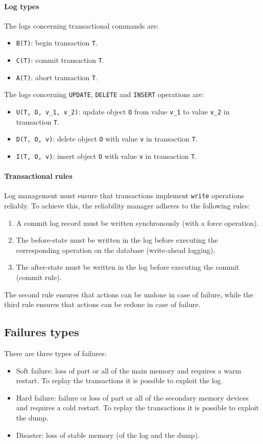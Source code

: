 \paragraph*{Log types}
The logs concerning transactional commands are: 
\begin{itemize}
    \item \texttt{B(T)}: begin transaction \texttt{T}.
    \item \texttt{C(T)}: commit transaction \texttt{T}.
    \item \texttt{A(T)}: abort transaction \texttt{T}.
\end{itemize}
The logs concerning \texttt{UPDATE}, \texttt{DELETE} and \texttt{INSERT} operations are:
\begin{itemize}
    \item \texttt{U(T, O, v\_1, v\_2)}: update object \texttt{O} from value \texttt{v\_1} to value \texttt{v\_2} in transaction \texttt{T}.
    \item \texttt{D(T, O, v)}: delete object \texttt{O} with value \texttt{v} in transaction \texttt{T}.
    \item \texttt{I(T, O, v)}: insert object \texttt{O} with value \texttt{v} in transaction \texttt{T}.
\end{itemize}

\paragraph{Transactional rules}
Log management must ensure that transactions implement \texttt{write} operations reliably. 
To achieve this, the reliability manager adheres to the following rules:
\begin{enumerate}
  \item A commit log record must be written synchronously (with a force operation).
  \item The before-state must be written in the log before executing the corresponding operation on the database (write-ahead logging).
  \item The after-state must be written in the log before executing the commit (commit rule).
\end{enumerate}
The second rule ensures that actions can be undone in case of failure, while the third rule ensures that actions can be redone in case of failure.

\subsection{Failures types}
There are three types of failures:
\begin{itemize}
    \item Soft failure: loss of part or all of the main memory and requires a warm restart. 
        To replay the transactions it is possible to exploit the log. 
    \item Hard failure: failure or loss of part or all of the secondary memory devices and requires a cold restart. 
        To replay the transactions it is possible to exploit the dump. 
    \item Disaster: loss of stable memory (of the log and the dump).
\end{itemize}

